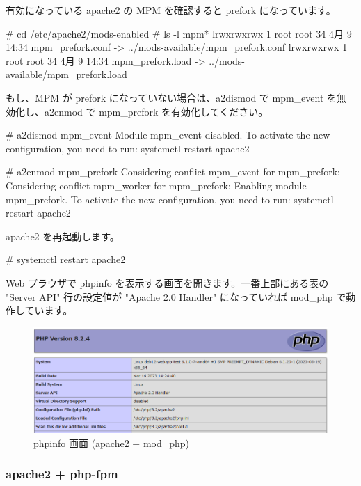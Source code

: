 \documentclass[mingoth,a4paper]{jsarticle}
\begin{document}
有効になっている apache2 の MPM を確認すると prefork になっています。

\begin{commandline}
# cd /etc/apache2/mods-enabled
# ls -l mpm*
lrwxrwxrwx 1 root root 34  4月  9 14:34 mpm_prefork.conf -> ../mods-available/mpm_prefork.conf
lrwxrwxrwx 1 root root 34  4月  9 14:34 mpm_prefork.load -> ../mods-available/mpm_prefork.load
\end{commandline}

もし、MPM が prefork になっていない場合は、a2dismod で mpm\_event を無効化し、a2enmod で mpm\_prefork を有効化してください。

\begin{commandline}
# a2dismod mpm_event
Module mpm_event disabled.
To activate the new configuration, you need to run:
  systemctl restart apache2

# a2enmod mpm_prefork
Considering conflict mpm_event for mpm_prefork:
Considering conflict mpm_worker for mpm_prefork:
Enabling module mpm_prefork.
To activate the new configuration, you need to run:
  systemctl restart apache2
\end{commandline}

apache2 を再起動します。

\begin{commandline}
# systemctl restart apache2
\end{commandline}

Web ブラウザで phpinfo を表示する画面を開きます。一番上部にある表の "Server API" 行の設定値が "Apache 2.0 Handler" になっていれば mod\_php で動作しています。

\begin{center}
  \begin{figure}[htbp]
    \includegraphics[width=1.00\hsize]{image202304/phpinfo_apache2-mod_php.png}
    \caption{phpinfo 画面 (apache2 + mod\_php)}
  \end{figure}
\end{center}


\subsubsection{apache2 + php-fpm}
\end{document}
